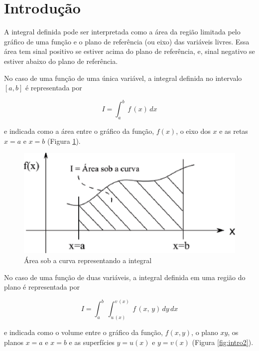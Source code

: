 \section{Introdução}

A integral definida pode ser interpretada como a \'area da regi\~ao limitada pelo gr\'afico de uma fun\c{c}\~ao e o plano de refer\^encia (ou eixo) das vari\'aveis livres. 
Essa \'area tem sinal positivo se estiver acima do plano de refer\^encia, e, sinal negativo se estiver abaixo do plano de refer\^encia.

No caso de uma fun\c{c}\~ao de uma \'unica vari\'{a}vel, a integral definida no intervalo $[a, b]$ \'e representada por 

\begin{equation}
 I = \int_a^b \, f\,(x) \, dx
\end{equation}

\noindent
e indicada como a \'area entre o gr\'afico da fun\c{c}\~ao, $f(x)$, o eixo dos $x$ e as retas $x = a$ e $x = b$ (Figura \ref{fig:intro1}).

\begin{figure}[htb]
 \centering
    \includegraphics[scale=0.8]{capitulos/capitulo2/figuras/intro1.eps}
    \caption{\'Area sob a curva representando a integral}
    \label{fig:intro1}
\end{figure}

No caso de uma fun\c{c}\~ao de duas vari\'{a}veis, a integral definida em uma regi\~{a}o do plano \'e representada por

\begin{equation}
   I = \displaystyle \int_a^b \, \int_{u\,(x)}^{v\,(x)} \, f\,(x,\,y) \, dy \, dx
\end{equation}

\noindent
e indicada como o volume entre o gr\'afico da fun\c{c}\~ao, $f(x,y)$, o plano $xy$, os planos $x = a$ e $x = b$ e as superf\'icies $y = u(x)$ e $y = v(x)$ (Figura \ref{fig:intro2}).

